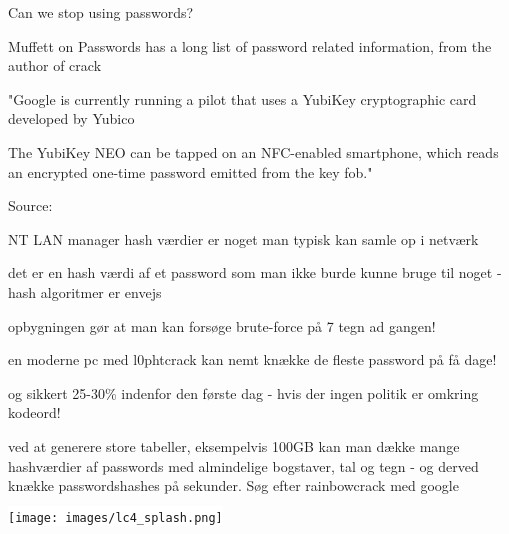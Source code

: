 \documentclass[20pt,landscape,a4paper,footrule]{foils}
\begin{document}


Can we stop using passwords?

Muffett on Passwords has a long list of password related information, from the author of crack 






"Google is currently running a pilot that uses a YubiKey cryptographic card developed by Yubico

The YubiKey NEO can be tapped on an NFC-enabled smartphone, which reads an encrypted one-time password emitted from the key fob."

Source:\\
{\footnotesize {}
}



\begin{list1}
  \item NT LAN manager hash værdier er noget man typisk kan samle op i
  netværk
\item det er en hash værdi af et password som man ikke burde kunne
  bruge til noget - hash algoritmer er envejs
\item opbygningen gør at man kan forsøge brute-force på 7 tegn ad
  gangen!
\item en moderne pc med l0phtcrack kan nemt knække de fleste password
  på få dage!
\item og sikkert 25-30\% indenfor den første dag - hvis der ingen
  politik er omkring kodeord!
\item ved at generere store tabeller, eksempelvis 100GB kan man dække
  mange hashværdier af passwords med almindelige bogstaver, tal og
  tegn - og derved knække passwordshashes på sekunder. Søg efter
  rainbowcrack med google
\end{list1}

\begin{center}
\colorbox{white}{\texttt{[image: images/lc4\_splash.png]}}
\end{center}
\end{document}

